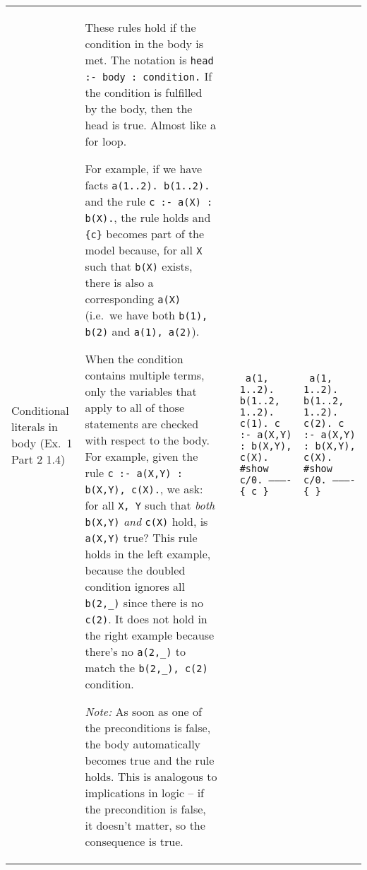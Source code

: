 \documentclass[9pt,a4paper,landscape]{article}
\begin{document}
{\begin{longtable}{Lp{14.5cm}lXX}
Conditional literals in body \newline (Ex.\ 1 Part 2 1.4)
& These rules hold if the condition in the body is met.
The notation is \texttt{head :- body : condition.} 
If the condition is fulfilled by the body, then the head is true. 
Almost like a for loop. \newline

For example, if we have facts \texttt{a(1..2). b(1..2).} and the rule \texttt{c :- a(X) : b(X).}, the rule holds and \texttt{\{c\}} becomes part of the model because, for all \texttt{X} such that \texttt{b(X)} exists, there is also a corresponding \texttt{a(X)} (i.e.\ we have both \texttt{b(1), b(2)} and \texttt{a(1), a(2)}). \newline

When the condition contains multiple terms, only the variables that apply to all of those statements are checked with respect to the body.
For example, given the rule \texttt{c :- a(X,Y) : b(X,Y), c(X).}, we ask: for all \texttt{X, Y} such that \textit{both} \texttt{b(X,Y)} \textit{and} \texttt{c(X)} hold, is \texttt{a(X,Y)} true? 
This rule holds in the left example, because the doubled condition ignores all \texttt{b(2,\_)} since there is no \texttt{c(2)}.
It does not hold in the right example because there's no \texttt{a(2,\_)} to match the \texttt{b(2,\_), c(2)} condition. \newline

\textit{Note:} As soon as one of the preconditions is false, the body automatically becomes true and the rule holds.
This is analogous to implications in logic -- if the precondition is false, it doesn't matter, so the consequence is true.

&& {\scriptsize\texttt{%
		a(1, 1..2). \newline
		b(1..2, 1..2). \newline
		c(1). \newline
		c :- a(X,Y) : b(X,Y), c(X).\newline
		\#show c/0.\newline
		---------- \newline
		\{ c \} \newline
}} & {\scriptsize\texttt{%
		a(1, 1..2). \newline
		b(1..2, 1..2). \newline
		c(2). \newline
		c :- a(X,Y) : b(X,Y), c(X).\newline
		\#show c/0.\newline
		---------- \newline
		\{ \} \newline
}}


\end{longtable}}
\end{document}
